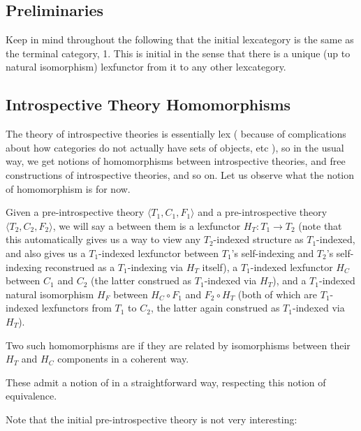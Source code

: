 \subsection{Preliminaries}
Keep in mind throughout the following that the initial lexcategory is the same as the terminal category, 1. This is initial in the sense that there is a unique (up to natural isomorphism) lexfunctor from it to any other lexcategory.

\subsection{Introspective Theory Homomorphisms}
The theory of introspective theories is essentially lex ( because of complications about how categories do not actually have sets of objects, etc \TODO), so in the usual way, we get notions of homomorphisms between introspective theories, and free constructions of introspective theories, and so on. Let us observe what the notion of homomorphism is for now.

\begin{definition}\label{PreIntrospHomo}
Given a pre-introspective theory $\langle T_1, C_1, F_1 \rangle$ and a pre-introspective theory $\langle T_2, C_2, F_2 \rangle$, we will say a  between them is a lexfunctor $H_T : T_1 \to T_2$ (note that this automatically gives us a way to view any $T_2$-indexed structure as $T_1$-indexed, and also gives us a $T_1$-indexed lexfunctor between $T_1$'s self-indexing and $T_2$'s self-indexing reconstrued as a $T_1$-indexing via $H_T$ itself), a $T_1$-indexed lexfunctor $H_C$ between $C_1$ and $C_2$ (the latter construed as $T_1$-indexed via $H_T$), and a $T_1$-indexed natural isomorphism $H_F$ between $H_C \circ F_1$ and $F_2 \circ H_T$ (both of which are $T_1$-indexed lexfunctors from $T_1$ to $C_2$, the latter again construed as $T_1$-indexed via $H_T$). 

Two such homomorphisms are  if they are related by isomorphisms between their $H_T$ and $H_C$ components in a coherent way. \TODO

These admit a notion of  in a straightforward way, respecting this notion of equivalence. \TODO
\end{definition}

Note that the initial pre-introspective theory is not very interesting:

